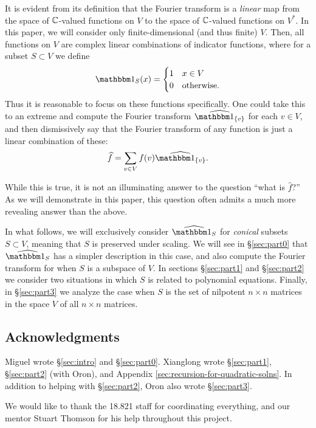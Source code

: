 It is evident from its definition that the Fourier transform is a \emph{linear} map from the space of $\mathbb{C}$-valued functions on $V$ to the space of $\mathbb{C}$-valued functions on $V^*$. In this paper, we will consider only finite-dimensional (and thus finite) $V$. Then, all functions on $V$ are complex linear combinations of indicator functions, where for a subset $S\subset V$ we define
\[ \IND_S(x) = \begin{cases}
1 & x \in V \\
0 & \text{otherwise.}     
\end{cases} \]
Thus it is reasonable to focus on these functions specifically. One could take this to an extreme and compute the Fourier transform $\widehat{\IND_{\{v\}}}$ for each $v\in V$, and then dismissively say that the Fourier transform of any function is just a linear combination of these:
\[
	\widehat{f} = \sum_{v\in V} f(v)\widehat{\IND_{\{v\}}}.
\]

While this is true, it is not an illuminating answer to the question ``what is $\widehat{f}$?'' As we will demonstrate in this paper, this question often admits a much more revealing answer than the above.

In what follows, we will exclusively consider $\widehat{\IND_S}$ for \emph{conical} subsets $S\subset V$, meaning that $S$ is preserved under scaling. We will see in \S\ref{sec:part0} that $\widehat{\IND_S}$ has a simpler description in this case, and also compute the Fourier transform for when $S$ is a subspace of $V$. In sections \S\ref{sec:part1} and \S\ref{sec:part2} we consider two situations in which $S$ is related to polynomial equations. Finally, in \S\ref{sec:part3} we analyze the case when $S$ is the set of nilpotent $n\times n$ matrices in the space $V$ of all $n\times n$ matrices.

\subsection*{Acknowledgments} Miguel wrote \S\ref{sec:intro} and \S\ref{sec:part0}. Xianglong wrote \S\ref{sec:part1}, \S\ref{sec:part2} (with Oron), and Appendix \ref{sec:recursion-for-quadratic-solns}. In addition to helping with \S\ref{sec:part2}, Oron also wrote \S\ref{sec:part3}.

We would like to thank the 18.821 staff for coordinating everything, and our mentor Stuart Thomson for his help throughout this project.